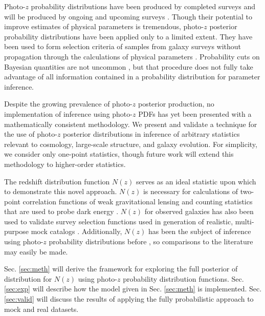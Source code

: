 \documentclass[preprint]{aastex}
\begin{document}
Photo-$z$ probability distributions have been produced by completed surveys 
\citep{Hildebrandt2012, Sheldon2012} and will be produced by ongoing and 
upcoming surveys \citep{LSSTScienceCollaboration2009, CarrascoKind2014a, 
Bonnett2015, Masters2015}.  Though their potential to improve estimates of 
physical parameters is tremendous, photo-$z$ posterior probability 
distributions have been applied only to a limited extent.  They have been used 
to form selection criteria of samples from galaxy surveys without propagation 
through the calculations of physical parameters 
\citep{VanBreukelen2009,Viironen2015}.  Probability cuts on Bayesian quantities 
are not uncommon \citep{Leung2015, DiPompeo2015a}, but that procedure does not 
fully take advantage of all information contained in a probability distribution 
for parameter inference.  

Despite the growing prevalence of photo-$z$ posterior production, no 
implementation of inference using photo-$z$ PDFs has yet been presented with a 
mathematically consistent methodology.  We present and validate a technique for 
the use of photo-$z$ posterior distributions in inference of arbitrary 
statistics relevant to cosmology, large-scale structure, and galaxy evolution.  
For simplicity, we consider only one-point statistics, though future work will 
extend this methodology to higher-order statistics.

The redshift distribution function $N(z)$ serves as an ideal statistic upon 
which to demonstrate this novel approach.  $N(z)$ is necessary for calculations 
of two-point correlation functions of weak gravitational lensing and counting 
statistics that are used to probe dark energy \citep{Masters2015}.  $N(z)$ for 
observed galaxies has also been used to validate survey selection functions 
used in generation of realistic, multi-purpose mock catalogs 
\citep{Norberg2002}.  Additionally, $N(z)$ has been the subject of inference 
using photo-$z$ probability distributions before \citep{Sheldon2012, 
Hildebrandt2012, Kelly2014, Benjamin2013, Bonnett2015a, Viironen2015, 
Asorey2016, Leistedt2016}, so comparisons to the literature may easily be made. 
 

Sec. \ref{sec:meth} will derive the framework for exploring the full posterior 
of distribution for $N(z)$ using photo-$z$ probability distribution functions.  
Sec. \ref{sec:exp} will describe how the model given in Sec. \ref{sec:meth} is 
implemented.  Sec. \ref{sec:valid} will discuss the results of applying the 
fully probabilistic approach to mock and real datasets.
\end{document}
